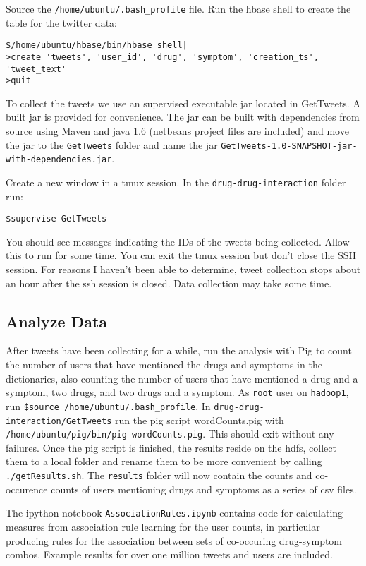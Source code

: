 \documentclass[letterpaper]{article}
\begin{document}
Source the \lstinline|/home/ubuntu/.bash_profile| file. Run the hbase shell to create the table for the twitter data:
\begin{lstlisting}
$/home/ubuntu/hbase/bin/hbase shell|
>create 'tweets', 'user_id', 'drug', 'symptom', 'creation_ts', 'tweet_text'
>quit
\end{lstlisting}

To collect the tweets we use an supervised executable jar located in GetTweets. A built jar is provided for convenience. The jar can be built with dependencies from source using Maven and java 1.6 (netbeans project files are included) and move the jar to the \lstinline|GetTweets| folder and name the jar \lstinline|GetTweets-1.0-SNAPSHOT-jar-with-dependencies.jar|.

Create a new window in a tmux session. In the \lstinline|drug-drug-interaction| folder run:
\begin{lstlisting}
$supervise GetTweets
\end{lstlisting} 
You should see messages indicating the IDs of the tweets being collected. Allow this to run for some time. You can exit the tmux session but don't close the SSH session. For reasons I haven't been able to determine, tweet collection stops about an hour after the ssh session is closed. Data collection may take some time.

\subsection{Analyze Data}

After tweets have been collecting for a while, run the analysis with Pig to count the number of users that have mentioned the drugs and symptoms in the dictionaries, also counting the number of users that have mentioned a drug and a symptom, two drugs, and two drugs and a symptom. As \lstinline|root| user on \lstinline|hadoop1|, run \lstinline|$source /home/ubuntu/.bash_profile|. In \lstinline|drug-drug-interaction/GetTweets| run the pig script wordCounts.pig with \lstinline|/home/ubuntu/pig/bin/pig wordCounts.pig|. This should exit without any failures. Once the pig script is finished, the results reside on the hdfs, collect them to a local folder and rename them to be more convenient by calling \lstinline|./getResults.sh|. The \lstinline|results| folder will now contain the counts and co-occurence counts of users mentioning drugs and symptoms as a series of csv files.

The ipython notebook \lstinline|AssociationRules.ipynb| contains code for calculating measures from association rule learning for the user counts, in particular producing rules for the association between sets of co-occuring drug-symptom combos. Example results for over one million tweets and users are included.
\end{document}
